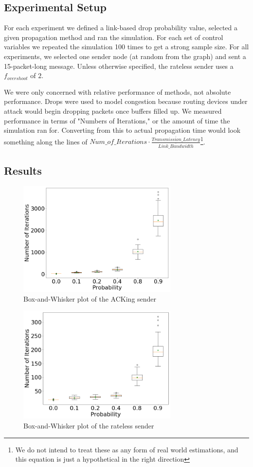 \subsection{Experimental Setup}
For each experiment we defined a link-based drop probability value, selected a given propagation method and ran the simulation. For each set of control variables we repeated the simulation 100 times to get a strong sample size. For all experiments, we selected one sender node (at random from the graph) and sent a 15-packet-long message. Unless otherwise specified, the rateless sender uses a $f_{overshoot}$ of $2$.

We were only concerned with relative performance of methods, not absolute performance. Drops were used to model congestion because routing devices under attack would begin dropping packets once buffers filled up. We measured performance in terms of "Numbers of Iterations," or the amount of time the simulation ran for. Converting from this to actual propagation time would look something along the lines of $Num\_of\_Iterations\cdot \frac{\overline{Transmission\_Latency}}{\overline{Link\_Bandwidth}}$\footnote{We do not intend to treat these as any form of real world estimations, and this equation is just a hypothetical in the right direction}.

\subsection{Results}

\begin{figure}[tp]
\centering
\noindent
\includegraphics[width=8cm]{figures/ACK_FINAL.png}
\caption{Box-and-Whisker plot of the ACKing sender }
\label{graph:ack}
\end{figure}

\begin{figure}[tp]
\centering
\noindent
\includegraphics[width=8cm]{figures/rateless_FINAL.png}
\caption{Box-and-Whisker plot of the rateless sender}
\label{graph:rateless}
\end{figure}


